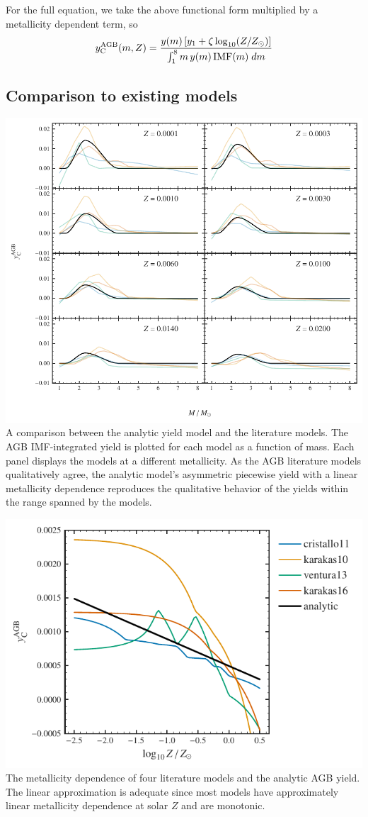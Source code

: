 For the full equation, we take the above functional form multiplied by a
metallicity dependent term, so \[
y_{\rm C}^{\rm AGB}(m, Z) = \frac{y(m) \left[y_1 + \zeta \log_{10}(Z/Z_\odot) \right]}{\int_1^8 m\,y(m)\,{\rm IMF}(m)\;dm}
\]

\hypertarget{comparison-to-existing-models}{%
\subsection{Comparison to existing
models}\label{comparison-to-existing-models}}

\includegraphics{figures/analytic_vs_studies_agb.pdf} A comparison
between the analytic yield model and the literature models. The AGB
IMF-integrated yield is plotted for each model as a function of mass.
Each panel displays the models at a different metallicity. As the AGB
literature models qualitatively agree, the analytic model's asymmetric
piecewise yield with a linear metallicity dependence reproduces the
qualitative behavior of the yields within the range spanned by the
models.

\includegraphics{figures/agb_ana_vs_z.pdf}\\
The metallicity dependence of four literature models and the analytic
AGB yield. The linear approximation is adequate since most models have
approximately linear metallicity dependence at solar \(Z\) and are
monotonic.

